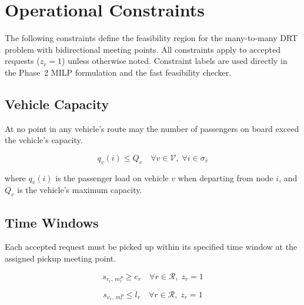 
\section*{Operational Constraints}

The following constraints define the feasibility region for the many-to-many DRT problem with
bidirectional meeting points. All constraints apply to accepted requests ($z_r = 1$) unless
otherwise noted. Constraint labels are used directly in the Phase~2 MILP formulation and the
fast feasibility checker.

\subsection*{Vehicle Capacity}

At no point in any vehicle's route may the number of passengers on board exceed the vehicle's
capacity.

\begin{equation}\label{con:capacity}
  q_v(i) \leq Q_v \quad \forall v \in \mathcal{V},\; \forall i \in \sigma_v
\end{equation}

where $q_v(i)$ is the passenger load on vehicle $v$ when departing from node $i$, and $Q_v$
is the vehicle's maximum capacity.

\subsection*{Time Windows}

Each accepted request must be picked up within its specified time window at the assigned pickup
meeting point.

\begin{equation}\label{con:tw-early}
  s_{v_r,\, m_r^P} \geq e_r \quad \forall r \in \mathcal{R},\; z_r = 1
\end{equation}

\begin{equation}\label{con:tw-late}
  s_{v_r,\, m_r^P} \leq l_r \quad \forall r \in \mathcal{R},\; z_r = 1
\end{equation}

